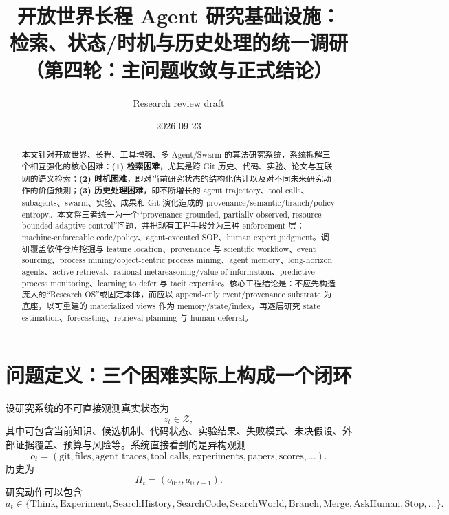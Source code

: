 \documentclass[11pt,a4paper]{ctexart}
\title{开放世界长程 Agent 研究基础设施：\\检索、状态/时机与历史处理的统一调研（第四轮：主问题收敛与正式结论）}
\author{Research review draft}
\date{2026-09-23}
\newcommand{\Z}{\mathcal{Z}}
\begin{document}
\maketitle

\begin{abstract}
本文针对开放世界、长程、工具增强、多 Agent/Swarm 的算法研究系统，系统拆解三个相互强化的核心困难：\textbf{(1) 检索困难}，尤其是跨 Git 历史、代码、实验、论文与互联网的语义检索；\textbf{(2) 时机困难}，即对当前研究状态的结构化估计以及对不同未来研究动作的价值预测；\textbf{(3) 历史处理困难}，即不断增长的 agent trajectory、tool calls、subagents、swarm、实验、成果和 Git 演化造成的 provenance/semantic/branch/policy entropy。本文将三者统一为一个“provenance-grounded, partially observed, resource-bounded adaptive control”问题，并把现有工程手段分为三种 enforcement 层：machine-enforceable code/policy、agent-executed SOP、human expert judgment。调研覆盖软件仓库挖掘与 feature location、provenance 与 scientific workflow、event sourcing、process mining/object-centric process mining、agent memory、long-horizon agents、active retrieval、rational metareasoning/value of information、predictive process monitoring、learning to defer 与 tacit expertise。核心工程结论是：不应先构造庞大的“Research OS”或固定本体，而应以 append-only event/provenance substrate 为底座，以可重建的 materialized views 作为 memory/state/index，再逐层研究 state estimation、forecasting、retrieval planning 与 human deferral。
\end{abstract}

\tableofcontents

\section{问题定义：三个困难实际上构成一个闭环}

设研究系统的不可直接观测真实状态为
\begin{equation}
 z_t\in\Z,
\end{equation}
其中可包含当前知识、候选机制、代码状态、实验结果、失败模式、未决假设、外部证据覆盖、预算与风险等。系统直接看到的是异构观测
\begin{equation}
 o_t=(\text{git},\text{files},\text{agent traces},\text{tool calls},\text{experiments},\text{papers},\text{scores},\ldots).
\end{equation}
历史为
\begin{equation}
 H_t=(o_{0:t},a_{0:t-1}).
\end{equation}
研究动作可以包含
\begin{equation}
 a_t\in\{\text{Think},\text{Experiment},\text{SearchHistory},\text{SearchCode},\text{SearchWorld},\text{Branch},\text{Merge},\text{AskHuman},\text{Stop},\ldots\}.
\end{equation}
\end{document}
